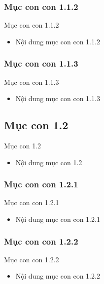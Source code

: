 \documentclass{beamer}
\begin{document}
\subsubsection{Mục con con 1.1.2}
\begin{frame}{Mục con con 1.1.2}
\begin{itemize}
\item Nội dung mục con con 1.1.2
\end{itemize}
\end{frame}

\subsubsection{Mục con con 1.1.3}
\begin{frame}{Mục con con 1.1.3}
\begin{itemize}
\item Nội dung mục con con 1.1.3
\end{itemize}
\end{frame}

\subsection{Mục con 1.2}
\begin{frame}{Mục con 1.2}
\begin{itemize}
\item Nội dung mục con 1.2
\end{itemize}
\end{frame}

\subsubsection{Mục con con 1.2.1}
\begin{frame}{Mục con con 1.2.1}
\begin{itemize}
\item Nội dung mục con con 1.2.1
\end{itemize}
\end{frame}

\subsubsection{Mục con con 1.2.2}
\begin{frame}{Mục con con 1.2.2}
\begin{itemize}
\item Nội dung mục con con 1.2.2
\end{itemize}
\end{frame}
\end{document}
